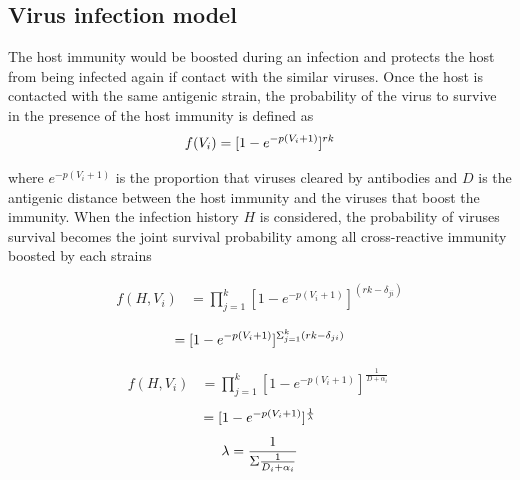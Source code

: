 \documentclass{article}
\begin{document}
\subsection{Virus infection model}

The host immunity would be boosted during an infection and protects the host from being infected again if contact with the similar viruses. Once the host is contacted with the same antigenic strain, the probability of the virus to survive in the presence of the host immunity is defined as
\begin{equation}
    \label{simple_equation}
    f(V_{i}) = [1-e^{-p(V_{i}+1)}]^{rk} \\
\end{equation}

where $e^{-p(V_{i}+1)}$ is the proportion that viruses cleared by antibodies and $D$ is the antigenic distance between the host immunity and the viruses that boost the immunity. When the infection history $H$ is considered, the probability of viruses survival becomes the joint survival probability among all cross-reactive immunity boosted by each strains

\begin{equation}
    \label{simple_equation}
    \begin{split}
    f(H,V_{i}) &= \prod_{j=1}^{k} [1-e^{-p(V_{i}+1)}]^{(rk-\delta_{ji})} \\
    \end{split}
\end{equation}
\begin{equation}
\space = [1-e^{-p(V_{i}+1)}]^{\Sigma_{j=1}^{k}(rk-\delta_{ji})} \\
\end{equation}

\begin{equation}
    \label{simple_equation}
    \begin{split}
    f(H,V_{i}) &= \prod_{j=1}^{k} [1-e^{-p(V_{i}+1)}]^{\frac{1}{D+\alpha_{i}}} \
    \end{split}
\end{equation}
\begin{equation}
\space = [1-e^{-p(V_{i}+1)}]^{\frac{1}{\lambda}} \\
\end{equation}
\begin{equation}
\lambda = \frac{1}{\Sigma{\frac{1}{D_{i}+\alpha_{i}}}} \\
\end{equation}
\end{document}
